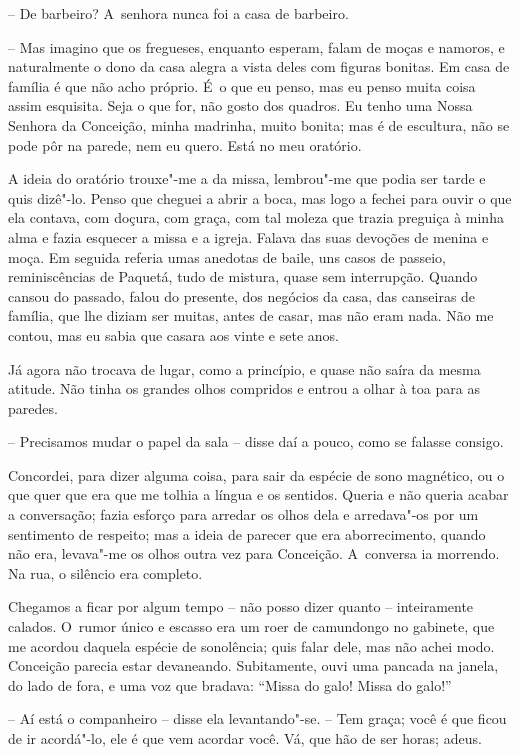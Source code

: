 -- De barbeiro? A~senhora nunca foi a casa de barbeiro.

-- Mas imagino que os fregueses, enquanto esperam, falam de moças e
namoros, e naturalmente o dono da casa alegra a vista deles com figuras
bonitas. Em casa de família é que não acho próprio. É~o que eu penso,
mas eu penso muita coisa assim esquisita. Seja o que for, não gosto dos
quadros. Eu tenho uma Nossa Senhora da Conceição, minha madrinha, muito
bonita; mas é de escultura, não se pode pôr na parede, nem eu quero.
Está no meu oratório.

A ideia do oratório trouxe"-me a da missa, lembrou"-me que podia ser tarde
e quis dizê"-lo. Penso que cheguei a abrir a boca, mas logo a fechei para
ouvir o que ela contava, com doçura, com graça, com tal moleza que
trazia preguiça à minha alma e fazia esquecer a missa e a igreja. Falava
das suas devoções de menina e moça. Em seguida referia umas anedotas de
baile, uns casos de passeio, reminiscências de Paquetá, tudo de mistura,
quase sem interrupção. Quando cansou do passado, falou do presente, dos
negócios da casa, das canseiras de família, que lhe diziam ser muitas,
antes de casar, mas não eram nada. Não me contou, mas eu sabia que
casara aos vinte e sete anos.

Já agora não trocava de lugar, como a princípio, e quase não saíra da
mesma atitude. Não tinha os grandes olhos compridos e entrou a olhar à
toa para as paredes.

-- Precisamos mudar o papel da sala -- disse daí a pouco, como se
falasse consigo.

Concordei, para dizer alguma coisa, para sair da espécie de sono
magnético, ou o que quer que era que me tolhia a língua e os sentidos.
Queria e não queria acabar a conversação; fazia esforço para arredar os
olhos dela e arredava"-os por um sentimento de respeito; mas a ideia de
parecer que era aborrecimento, quando não era, levava"-me os olhos outra
vez para Conceição. A~conversa ia morrendo. Na rua, o silêncio era
completo.

Chegamos a ficar por algum tempo -- não posso dizer quanto --
inteiramente calados. O~rumor único e escasso era um roer de camundongo
no gabinete, que me acordou daquela espécie de sonolência; quis falar
dele, mas não achei modo. Conceição parecia estar devaneando.
Subitamente, ouvi uma pancada na janela, do lado de fora, e uma voz que
bradava: ``Missa do galo! Missa do galo!''

-- Aí está o companheiro -- disse ela levantando"-se. -- Tem graça; você
é que ficou de ir acordá"-lo, ele é que vem acordar você. Vá, que hão de
ser horas; adeus.

